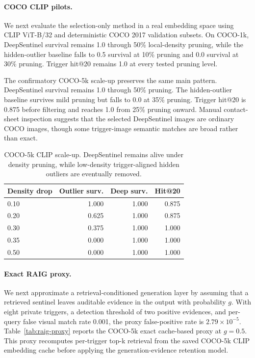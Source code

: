 \documentclass[letterpaper,twocolumn,10pt]{article}
\begin{document}
\paragraph{COCO CLIP pilots.}
We next evaluate the selection-only method in a real embedding space using
CLIP ViT-B/32 and deterministic COCO 2017 validation subsets. On COCO-1k,
DeepSentinel survival remains 1.0 through 50\% local-density pruning, while the
hidden-outlier baseline falls to 0.5 survival at 10\% pruning and 0.0 survival
at 30\% pruning. Trigger hit@20 remains 1.0 at every tested pruning level.

The confirmatory COCO-5k scale-up preserves the same main pattern. DeepSentinel
survival remains 1.0 through 50\% pruning. The hidden-outlier baseline survives
mild pruning but falls to 0.0 at 35\% pruning. Trigger hit@20 is 0.875 before
filtering and reaches 1.0 from 25\% pruning onward. Manual contact-sheet
inspection suggests that the selected DeepSentinel images are ordinary COCO
images, though some trigger-image semantic matches are broad rather than exact.

\begin{table}[t]
\centering
\small
\begin{tabular}{lrrr}
\toprule
Density drop & Outlier surv. & Deep surv. & Hit@20 \\
\midrule
0.10 & 1.000 & 1.000 & 0.875 \\
0.20 & 0.625 & 1.000 & 0.875 \\
0.30 & 0.375 & 1.000 & 1.000 \\
0.35 & 0.000 & 1.000 & 1.000 \\
0.50 & 0.000 & 1.000 & 1.000 \\
\bottomrule
\end{tabular}
\caption{COCO-5k CLIP scale-up. DeepSentinel remains alive under density
pruning, while low-density trigger-aligned hidden outliers are eventually
removed.}
\end{table}

\paragraph{Exact RAIG proxy.}
We next approximate a retrieval-conditioned generation layer by assuming that a
retrieved sentinel leaves auditable evidence in the output with probability
$g$. With eight private triggers, a detection threshold of two positive
evidences, and per-query false visual match rate 0.001, the proxy false-positive
rate is $2.79\times 10^{-5}$. Table~\ref{tab:raig-proxy} reports the
COCO-5k exact cache-based proxy at $g=0.5$. This proxy recomputes per-trigger
top-k retrieval from the saved COCO-5k CLIP embedding cache before applying the
generation-evidence retention model.
\end{document}
